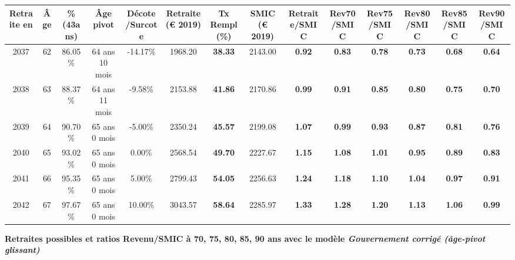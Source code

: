 \begin{adjustbox}{max width=\textwidth} 
\begin{tabular}[htb]{|c|c||c|c|c||c|c||c||c|c|c|c|c|c|} 
\hline 
 Retraite en &  Âge &  \%(43ans) &  Âge pivot &  Décote/Surcote &  Retraite (\euro{} 2019) &  Tx Rempl(\%) &  SMIC (\euro{} 2019) &  Retraite/SMIC &  Rev70/SMIC &  Rev75/SMIC &  Rev80/SMIC &  Rev85/SMIC &  Rev90/SMIC \\ 
\hline \hline 
 2037 &  62 &  86.05\% &  64 ans 10 mois &  -14.17\% &  1968.20 &  {\bf 38.33} &  2143.00 &  {\bf {\color{red} 0.92}} &  {\bf {\color{red} 0.83}} &  {\bf {\color{red} 0.78}} &  {\bf {\color{red} 0.73}} &  {\bf {\color{red} 0.68}} &  {\bf {\color{red} 0.64}} \\ 
\hline 
 2038 &  63 &  88.37\% &  64 ans 11 mois &  -9.58\% &  2153.88 &  {\bf 41.86} &  2170.86 &  {\bf {\color{red} 0.99}} &  {\bf {\color{red} 0.91}} &  {\bf {\color{red} 0.85}} &  {\bf {\color{red} 0.80}} &  {\bf {\color{red} 0.75}} &  {\bf {\color{red} 0.70}} \\ 
\hline 
 2039 &  64 &  90.70\% &  65 ans 0 mois &  -5.00\% &  2350.24 &  {\bf 45.57} &  2199.08 &  {\bf 1.07} &  {\bf {\color{red} 0.99}} &  {\bf {\color{red} 0.93}} &  {\bf {\color{red} 0.87}} &  {\bf {\color{red} 0.81}} &  {\bf {\color{red} 0.76}} \\ 
\hline 
 2040 &  65 &  93.02\% &  65 ans 0 mois &  0.00\% &  2568.54 &  {\bf 49.70} &  2227.67 &  {\bf 1.15} &  {\bf 1.08} &  {\bf 1.01} &  {\bf {\color{red} 0.95}} &  {\bf {\color{red} 0.89}} &  {\bf {\color{red} 0.83}} \\ 
\hline 
 2041 &  66 &  95.35\% &  65 ans 0 mois &  5.00\% &  2799.43 &  {\bf 54.05} &  2256.63 &  {\bf 1.24} &  {\bf 1.18} &  {\bf 1.10} &  {\bf 1.04} &  {\bf {\color{red} 0.97}} &  {\bf {\color{red} 0.91}} \\ 
\hline 
 2042 &  67 &  97.67\% &  65 ans 0 mois &  10.00\% &  3043.57 &  {\bf 58.64} &  2285.97 &  {\bf 1.33} &  {\bf 1.28} &  {\bf 1.20} &  {\bf 1.13} &  {\bf 1.06} &  {\bf {\color{red} 0.99}} \\ 
\hline 
\hline 
\end{tabular} 
\end{adjustbox} 
 
 \vspace{0.1cm} 
{\bf \noindent Retraites possibles et ratios Revenu/SMIC à 70, 75, 80, 85, 90 ans avec le modèle \emph{Gouvernement corrigé (âge-pivot glissant)}}  
 
